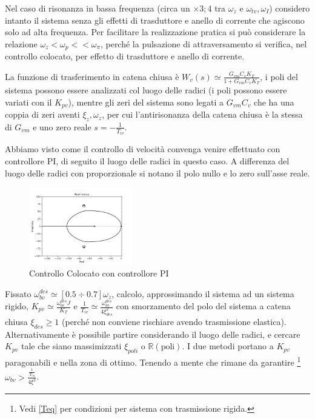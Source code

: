 Nel caso di risonanza in bassa frequenza (circa un \(\times 3;4\) tra \(\omega_z\) e \(\omega_{tv}, \omega_I\)) considero intanto il sistema senza gli effetti di trasduttore e anello di corrente che agiscono solo ad alta frequenza.
Per facilitare la realizzazione pratica si può considerare la relazione \(\omega_z < \omega_p << \omega_\pi\), perché la pulsazione di attraversamento si verifica, nel controllo colocato, per effetto di trasduttore e anello di corrente.

La funzione di trasferimento in catena chiusa è \(W_v(s) \simeq \frac{G_{vm}C_v K_T}{1+G_{vm}C_v K_T}\), i poli del sistema possono essere analizzati col luogo delle radici (i poli possono essere variati con il \(K_{pv}\)), mentre gli zeri del sistema sono legati a \(G_{vm}C_v\) che ha una coppia di zeri aventi \(\xi_z, \omega_z\), per cui l'antirisonanza della catena chiusa è la stessa di \(G_{vm}\) e uno zero reale \(s=-\frac{1}{T_{iv}}\).

Abbiamo visto come il controllo di velocità convenga venire effettuato con controllore PI, di seguito il luogo delle radici in questo caso. A differenza del luogo delle radici con proporzionale si notano il polo nullo e lo zero sull'asse reale.

\begin{figure}[h]
    \centering
    \includegraphics[width=0.4\textwidth]{Immagini/controllo_v_colocato_PI.png}
    \caption{Controllo Colocato con controllore PI}
\end{figure}

Fissato \(\omega_{bv}^{des} \simeq [0.5\div 0.7]\omega_z\), calcolo, approssimando il sistema ad un sistema rigido, \(K_{pv} \simeq \frac{\omega_{bv}^{des} J}{K_T}\) e \(\frac{1}{T_{iv}} \simeq \frac{\omega_{bv}^{des}}{4 \xi_{des}^2}\) con smorzamento del polo del sistema a catena chiusa \(\xi_{des} \geqslant 1\) (perché non conviene rischiare avendo trasmissione elastica).
Alternativamente è possibile partire considerando il luogo delle radici, e cercare \(K_{pv}\) tale che siano massimizzati \(\xi_{poli}\) o \(\mathbb{R}(\text{poli})\).
I due metodi portano a \(K_{pv}\) paragonabili e nella zona di ottimo.
Tenendo a mente che rimane da garantire \footnote{Vedi \ref{Teq} per condizioni per sistema con trasmissione rigida.} \(\omega_{bv} > \frac{\frac{1}{T_{eq}}}{4\xi^2}\).

